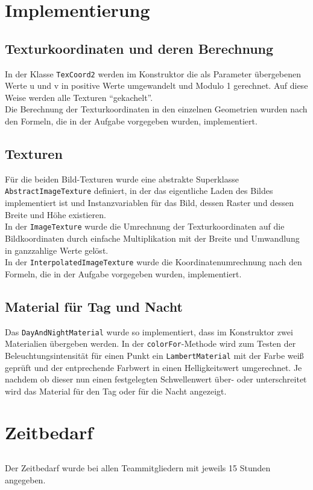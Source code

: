 \documentclass[11pt]{amsart}
\begin{document}
\section{Implementierung}
\subsection{Texturkoordinaten und deren Berechnung}
In der Klasse \texttt{TexCoord2} werden im Konstruktor die als Parameter \"ubergebenen Werte u und v in positive Werte 
umgewandelt und Modulo 1 gerechnet. Auf diese Weise werden alle Texturen "`gekachelt"'. \\
Die Berechnung der Texturkoordinaten in den einzelnen Geometrien wurden nach den Formeln, die in der Aufgabe vorgegeben 
wurden, implementiert.


\subsection{Texturen}
F\"ur die beiden Bild-Texturen wurde eine abstrakte Superklasse \\ \texttt{AbstractImageTexture} definiert, in der das 
eigentliche Laden des Bildes implementiert ist und Instanzvariablen f\"ur das Bild, dessen Raster und dessen Breite und 
H\"ohe existieren. \\
In der \texttt{ImageTexture} wurde die Umrechnung der Texturkoordinaten auf die Bildkoordinaten durch einfache 
Multiplikation mit der Breite und Umwandlung in ganzzahlige Werte gel\"ost. \\
In der \texttt{InterpolatedImageTexture} wurde die Koordinatenumrechnung nach den Formeln, die in der Aufgabe 
vorgegeben wurden, implementiert.


\subsection{Material f\"ur Tag und Nacht}
Das \texttt{DayAndNightMaterial} wurde so implementiert, dass im Konstruktor zwei Materialien \"ubergeben werden. In 
der \texttt{colorFor}-Methode wird zum Testen der Beleuchtungsintensit\"at f\"ur einen Punkt ein 
\texttt{LambertMaterial} mit der Farbe wei\ss{} gepr\"uft und der entprechende Farbwert in einen Helligkeitswert 
umgerechnet. Je nachdem ob dieser nun einen festgelegten Schwellenwert \"uber- oder unterschreitet wird das Material 
f\"ur den Tag oder f\"ur die Nacht angezeigt.



\section{Zeitbedarf}
\subsection{}
Der Zeitbedarf wurde bei allen Teammitgliedern mit jeweils 15 Stunden angegeben.
\end{document}
